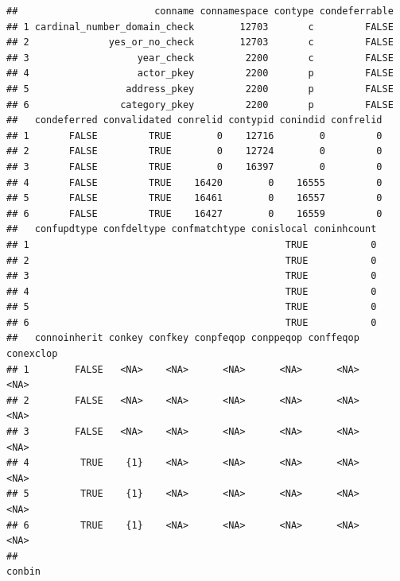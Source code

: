 \documentclass[]{book}
\theoremstyle{definition}
\theoremstyle{definition}
\theoremstyle{definition}
\theoremstyle{remark}
\begin{document}
\begin{verbatim}
##                        conname connamespace contype condeferrable
## 1 cardinal_number_domain_check        12703       c         FALSE
## 2              yes_or_no_check        12703       c         FALSE
## 3                   year_check         2200       c         FALSE
## 4                   actor_pkey         2200       p         FALSE
## 5                 address_pkey         2200       p         FALSE
## 6                category_pkey         2200       p         FALSE
##   condeferred convalidated conrelid contypid conindid confrelid
## 1       FALSE         TRUE        0    12716        0         0
## 2       FALSE         TRUE        0    12724        0         0
## 3       FALSE         TRUE        0    16397        0         0
## 4       FALSE         TRUE    16420        0    16555         0
## 5       FALSE         TRUE    16461        0    16557         0
## 6       FALSE         TRUE    16427        0    16559         0
##   confupdtype confdeltype confmatchtype conislocal coninhcount
## 1                                             TRUE           0
## 2                                             TRUE           0
## 3                                             TRUE           0
## 4                                             TRUE           0
## 5                                             TRUE           0
## 6                                             TRUE           0
##   connoinherit conkey confkey conpfeqop conppeqop conffeqop conexclop
## 1        FALSE   <NA>    <NA>      <NA>      <NA>      <NA>      <NA>
## 2        FALSE   <NA>    <NA>      <NA>      <NA>      <NA>      <NA>
## 3        FALSE   <NA>    <NA>      <NA>      <NA>      <NA>      <NA>
## 4         TRUE    {1}    <NA>      <NA>      <NA>      <NA>      <NA>
## 5         TRUE    {1}    <NA>      <NA>      <NA>      <NA>      <NA>
## 6         TRUE    {1}    <NA>      <NA>      <NA>      <NA>      <NA>
##                                                                                                                                                                                                                                                                                                                                                                                                                                                                                                                                                                                                                                                                                                                                                                                                                                                  conbin

\end{verbatim}
\end{document}

